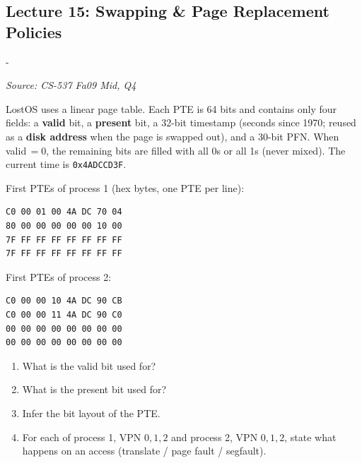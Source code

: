 \documentclass[11pt,a4paper]{article}
\makeatletter
\newcommand{\keepspace}[1]{\par\penalty-100\begingroup
  \setlength{\dimen@}{#1}\dimen@ii\pagegoal\advance\dimen@ii-\pagetotal
  \ifdim\dimen@>\dimen@ii\ifdim\dimen@ii>\z@\vfil\fi\break\fi\endgroup}
\newcounter{qn}[section]
\newenvironment{Qn}[4]{%
  \refstepcounter{qn}\keepspace{7\baselineskip}%
  \begin{tcolorbox}[qboxstyle, title={Q\thesection.\theqn\ \ [#1 \textbar\ #2]\ \ #4}]%
  {\footnotesize\color{g3}\textit{Source: #3}}\par\smallskip%
}{%
  \end{tcolorbox}%
}
\makeatother
\begin{document}
\subsection{Lecture 15: Swapping \& Page Replacement Policies}

\begin{Qn}{Hard}{Lect 15}{CS-537 Fa09 Mid, Q4}{Valid bit vs present bit, and a dumped PTE}
LostOS uses a linear page table. Each PTE is 64 bits and contains only four
fields: a \textbf{valid} bit, a \textbf{present} bit, a 32-bit timestamp
(seconds since 1970; reused as a \textbf{disk address} when the page is
swapped out), and a 30-bit PFN. When valid$\,=0$, the remaining bits are
filled with all 0s or all 1s (never mixed). The current time is
\texttt{0x4ADCCD3F}.

First PTEs of process 1 (hex bytes, one PTE per line):
\begin{lstlisting}[numbers=none]
C0 00 01 00 4A DC 70 04
80 00 00 00 00 00 10 00
7F FF FF FF FF FF FF FF
7F FF FF FF FF FF FF FF
\end{lstlisting}
First PTEs of process 2:
\begin{lstlisting}[numbers=none]
C0 00 00 10 4A DC 90 CB
C0 00 00 11 4A DC 90 C0
00 00 00 00 00 00 00 00
00 00 00 00 00 00 00 00
\end{lstlisting}
\begin{enumerate}
  \item[(a)] What is the valid bit used for?
  \item[(b)] What is the present bit used for?
  \item[(c)] Infer the bit layout of the PTE.
  \item[(d)] For each of process 1, VPN $0,1,2$ and process 2, VPN $0,1,2$,
        state what happens on an access (translate / page fault / segfault).
\end{enumerate}
\end{Qn}
\end{document}
